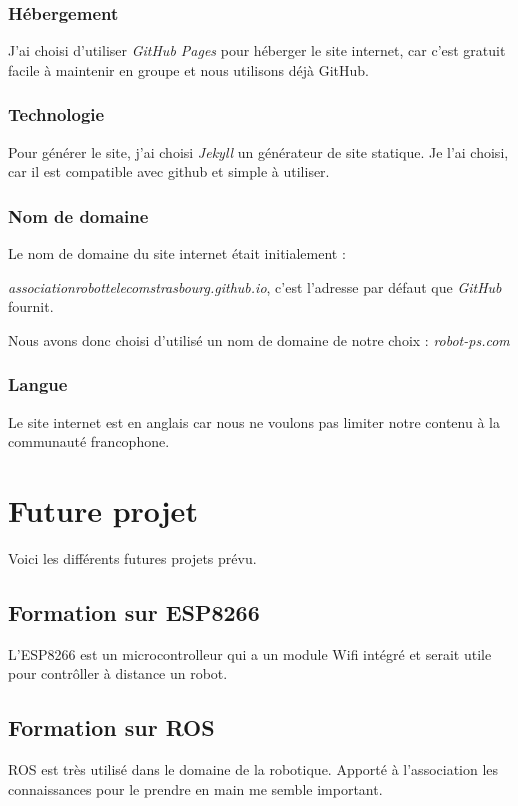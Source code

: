 \documentclass[11pt,a4paper]{report}
\begin{document}
      \subsubsection{Hébergement}
        J'ai choisi d'utiliser \emph{GitHub Pages} pour héberger le site internet, car c'est gratuit facile à maintenir en groupe et nous utilisons déjà GitHub.

      \subsubsection{Technologie}
        Pour générer le site, j'ai choisi \emph{Jekyll} un générateur de site statique. Je l'ai choisi, car il est compatible avec github et simple à utiliser.

      \subsubsection{Nom de domaine}
        Le nom de domaine du site internet était initialement :

        \emph{associationrobottelecomstrasbourg.github.io}, c'est l'adresse par défaut que \emph{GitHub} fournit.

        Nous avons donc choisi d'utilisé un nom de domaine de notre choix : \emph{robot-ps.com}

      \subsubsection{Langue}
        Le site internet est en anglais car nous ne voulons pas limiter notre contenu à la communauté francophone.

  \section{Future projet}
    Voici les différents futures projets prévu.

    \subsection{Formation sur ESP8266}
      L'ESP8266 est un microcontrolleur qui a un module Wifi intégré et serait utile pour contr\^oller à distance un robot.

    \subsection{Formation sur ROS}
      ROS est très utilisé dans le domaine de la robotique. Apporté à l'association les connaissances pour le prendre en main me semble important.
\end{document}
